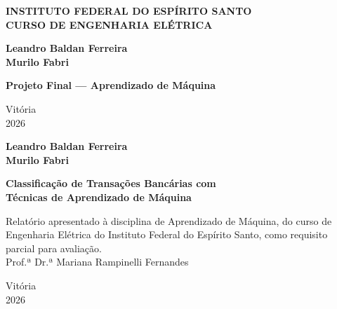 \documentclass[a4paper,12pt]{article}
\begin{document}
\thispagestyle{empty}

\begin{center}
    \textbf{INSTITUTO FEDERAL DO ESPÍRITO SANTO}\\
    \textbf{CURSO DE ENGENHARIA ELÉTRICA}
\end{center}

\vspace{6cm}

\begin{center}
\textbf{Leandro Baldan Ferreira}\\
\textbf{Murilo Fabri}
\end{center}

\vspace{2cm}

\begin{center}
    \textbf{Projeto Final — Aprendizado de Máquina}
\end{center}

\vfill

\begin{center}
    Vitória\\
    2026
\end{center}

\newpage
\thispagestyle{empty}

\begin{center}
\textbf{Leandro Baldan Ferreira}\\
\textbf{Murilo Fabri}
\end{center}

\vspace{4cm}
\begin{center}
\textbf{\LARGE Classificação de Transações Bancárias com\\Técnicas de Aprendizado de Máquina}
\end{center}

\vspace{5cm}
\hspace{7cm}
\parbox{8cm}{
\small
Relatório apresentado à disciplina de Aprendizado de Máquina, do curso de Engenharia Elétrica do Instituto Federal do Espírito Santo, como requisito parcial para avaliação.\\
\newline
Prof.ª Dr.ª Mariana Rampinelli Fernandes
}

\vfill{}
\begin{center}
Vitória \\
2026
\end{center}
\end{document}
